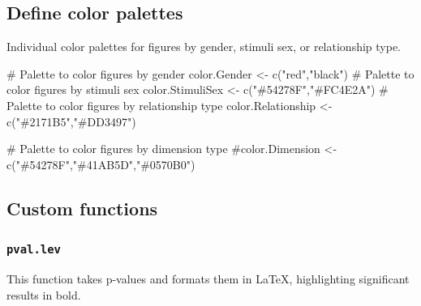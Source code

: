 \documentclass[
  bookmarksnumbered]{article}
\newenvironment{Shaded}{\begin{snugshade}}{\end{snugshade}}
\newcommand{\CommentTok}[1]{\textcolor[rgb]{0.50,0.62,0.50}{#1}}
\newcommand{\FunctionTok}[1]{\textcolor[rgb]{0.94,0.94,0.56}{#1}}
\newcommand{\NormalTok}[1]{\textcolor[rgb]{0.80,0.80,0.80}{#1}}
\newcommand{\OtherTok}[1]{\textcolor[rgb]{0.94,0.94,0.56}{#1}}
\newcommand{\StringTok}[1]{\textcolor[rgb]{0.80,0.58,0.58}{#1}}
\begin{document}
\subsection{Define color palettes}\label{define-color-palettes}

Individual color palettes for figures by gender, stimuli sex, or relationship type.

\begin{Shaded}
\begin{Highlighting}[]
\CommentTok{\# Palette to color figures by gender}
\NormalTok{color.Gender }\OtherTok{\textless{}{-}} \FunctionTok{c}\NormalTok{(}\StringTok{"red"}\NormalTok{,}\StringTok{"black"}\NormalTok{)}
\CommentTok{\# Palette to color figures by stimuli sex}
\NormalTok{color.StimuliSex }\OtherTok{\textless{}{-}} \FunctionTok{c}\NormalTok{(}\StringTok{"\#54278F"}\NormalTok{,}\StringTok{"\#FC4E2A"}\NormalTok{)}
\CommentTok{\# Palette to color figures by relationship type}
\NormalTok{color.Relationship }\OtherTok{\textless{}{-}} \FunctionTok{c}\NormalTok{(}\StringTok{"\#2171B5"}\NormalTok{,}\StringTok{"\#DD3497"}\NormalTok{)}



\CommentTok{\# Palette to color figures by dimension type}
\CommentTok{\#color.Dimension \textless{}{-} c("\#54278F","\#41AB5D","\#0570B0")}
\end{Highlighting}
\end{Shaded}

\subsection{Custom functions}\label{custom-functions}

\subsubsection{\texorpdfstring{\texttt{pval.lev}}{pval.lev}}\label{pval.lev}

This function takes p-values and formats them in \LaTeX, highlighting significant results in bold.
\end{document}
